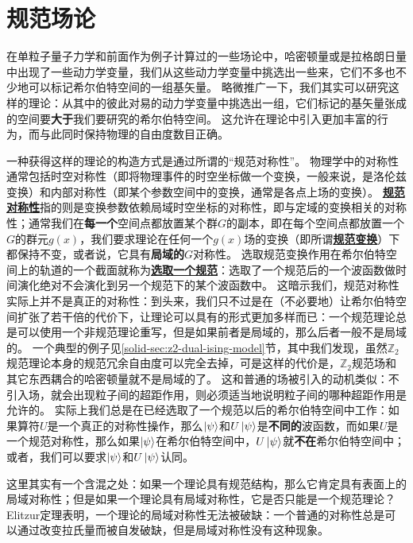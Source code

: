 \documentclass[hyperref, UTF8, a4paper]{ctexbook}
\newcommand{\concept}[1]{\underline{\textbf{#1}}}
\renewcommand{\emph}{\textbf}
\newcommand{\soliddoc}{\href{../solid/solid}{固体物理笔记}}
\begin{document}






\part{规范场论}

在单粒子量子力学和前面作为例子计算过的一些场论中，哈密顿量或是拉格朗日量中出现了一些动力学变量，我们从这些动力学变量中挑选出一些来，它们不多也不少地可以标记希尔伯特空间的一组基矢量。
略微推广一下，我们其实可以研究这样的理论：从其中的彼此对易的动力学变量中挑选出一组，它们标记的基矢量张成的空间要\emph{大于}我们要研究的希尔伯特空间。
这允许在理论中引入更加丰富的行为，而与此同时保持物理的自由度数目正确。

一种获得这样的理论的构造方式是通过所谓的“规范对称性”。
物理学中的对称性通常包括时空对称性（即将物理事件的时空坐标做一个变换，一般来说，是洛伦兹变换）和内部对称性（即某个参数空间中的变换，通常是各点上场的变换）。
\concept{规范对称性}指的则是变换参数依赖局域时空坐标的对称性，即与定域的变换相关的对称性；通常我们在\emph{每一个}空间点都放置某个群$G$的副本，即在每个空间点都放置一个$G$的群元$g(x)$，我们要求理论在任何一个$g(x)$场的变换（即所谓\concept{规范变换}）下都保持不变，或者说，它具有\emph{局域的}$G$对称性。
选取规范变换作用在希尔伯特空间上的轨道的一个截面就称为\concept{选取一个规范}：选取了一个规范后的一个波函数做时间演化绝对不会演化到另一个规范下的某个波函数中。
这暗示我们，规范对称性实际上并不是真正的对称性：到头来，我们只不过是在（不必要地）让希尔伯特空间扩张了若干倍的代价下，让理论可以具有的形式更加多样而已：一个规范理论总是可以使用一个非规范理论重写，但是如果前者是局域的，那么后者一般不是局域的。
一个典型的例子见\ref{solid-sec:z2-dual-ising-model}节，其中我们发现，虽然$\mathbb{Z}_2$规范理论本身的规范冗余自由度可以完全去掉，可是这样的代价是，$\mathbb{Z}_2$规范场和其它东西耦合的哈密顿量就不是局域的了。
这和普通的场被引入的动机类似：不引入场，就会出现粒子间的超距作用，则必须适当地说明粒子间的哪种超距作用是允许的。
实际上我们总是在已经选取了一个规范以后的希尔伯特空间中工作：如果算符$U$是一个真正的对称性操作，那么$\ket{\psi}$和$U \ket{\psi}$是\emph{不同的}波函数，而如果$U$是一个规范对称性，那么如果$\ket{\psi}$在希尔伯特空间中，$U \ket{\psi}$就\emph{不在}希尔伯特空间中；或者，我们可以要求$\ket{\psi}$和$U \ket{\psi}$认同。

这里其实有一个含混之处：如果一个理论具有规范结构，那么它肯定具有表面上的局域对称性；但是如果一个理论具有局域对称性，它是否只能是一个规范理论？
Elitzur定理\cite{Elitzur_1975}表明，一个理论的局域对称性无法被破缺：一个普通的对称性总是可以通过改变拉氏量而被自发破缺，但是局域对称性没有这种现象。
\end{document}
